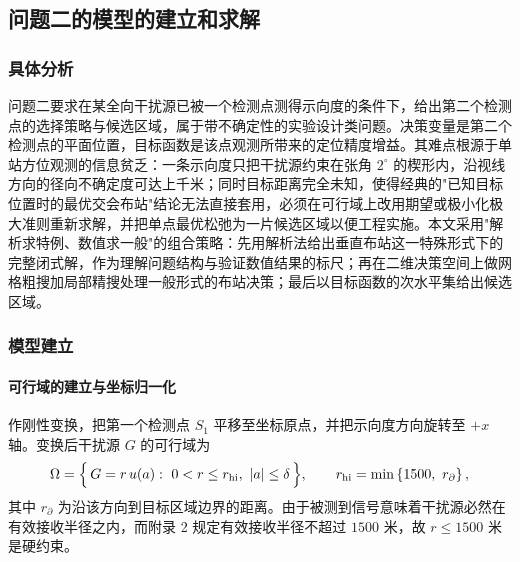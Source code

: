 
\subsection{问题二的模型的建立和求解}
\subsubsection{具体分析}

问题二要求在某全向干扰源已被一个检测点测得示向度的条件下，给出第二个检测点的选择策略与候选区域，属于带不确定性的实验设计类问题。决策变量是第二个检测点的平面位置，目标函数是该点观测所带来的定位精度增益。其难点根源于单站方位观测的信息贫乏：一条示向度只把干扰源约束在张角 $2^\circ$ 的楔形内，沿视线方向的径向不确定度可达上千米；同时目标距离完全未知，使得经典的"已知目标位置时的最优交会布站"结论无法直接套用，必须在可行域上改用期望或极小化极大准则重新求解，并把单点最优松弛为一片候选区域以便工程实施。本文采用"解析求特例、数值求一般"的组合策略：先用解析法给出垂直布站这一特殊形式下的完整闭式解，作为理解问题结构与验证数值结果的标尺；再在二维决策空间上做网格粗搜加局部精搜处理一般形式的布站决策；最后以目标函数的次水平集给出候选区域。

\subsubsection{模型建立}

\paragraph{可行域的建立与坐标归一化} 作刚性变换，把第一个检测点 $S_1$ 平移至坐标原点，并把示向度方向旋转至 $+x$ 轴。变换后干扰源 $G$ 的可行域为
\begin{equation}
\Omega=\Bigl\{\,G=r\,u(a):\ 0<r\le r_{\mathrm{hi}},\ \lvert a\rvert\le\delta\,\Bigr\},
\qquad r_{\mathrm{hi}}=\min\left\{1500,\ r_{\partial}\right\},
\label{eq:omega}
\end{equation}
其中 $r_{\partial}$ 为沿该方向到目标区域边界的距离。由于被测到信号意味着干扰源必然在有效接收半径之内，而附录 2 规定有效接收半径不超过 $1500$ 米，故 $r\le1500$ 米是硬约束。

